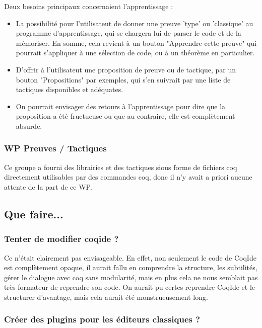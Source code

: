         Deux besoins principaux concernaient l'apprentissage :
		\begin{itemize}
			\item La possibilité pour l'utilisateut de donner une preuve 'type' ou 'classique' au programme d'apprentissage, qui se chargera lui de parser le code et de la mémoriser. En somme, cela revient à un bouton "Apprendre cette preuve" qui pourrait s'appliquer à une sélection de code, ou à un théorème en particulier.
			\item D'offrir à l'utilisateut une proposition de preuve ou de tactique, par un bouton "Propositions" par exemples, qui s'en suivrait par une liste de tactiques disponibles et adéquates.
			\item On pourrait envisager des retours à l'apprentissage pour dire que la proposition a été fructueuse ou que au contraire, elle est complètement absurde.
		\end{itemize}
			
		\subsubsection{WP Preuves / Tactiques}
			Ce groupe a fourni des librairies et des tactiques sious forme de fichiers coq directement utilisables par des commandes coq, donc il n'y avait a priori aucune attente de la part de ce WP.

    \subsection{Que faire...}

        \subsubsection{Tenter de modifier coqide ?}

            Ce n'était clairement pas envisageable. En effet, non seulement le code de CoqIde est complètement opaque, il aurait fallu en comprendre la structure, les subtilités, gérer le dialogue avec coq sans modularité, mais en plus cela ne nous semblait pas très formateur de reprendre son code. On aurait pu certes reprendre CoqIde et le structurer d'avantage, mais cela aurait été monstrueusement long.
			
        \subsubsection{Créer des plugins pour les éditeurs classiques ?}


